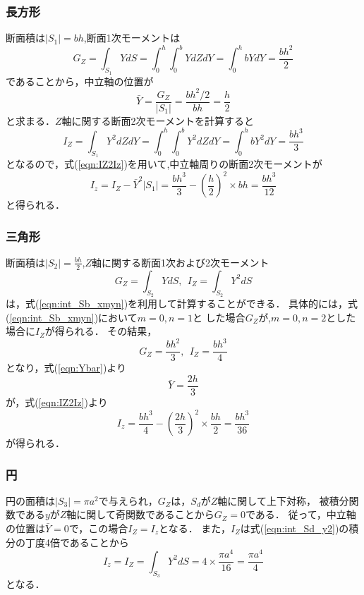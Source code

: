 \documentclass[10pt,a4j]{jbook}
\begin{document}
\subsubsection{長方形}
断面積は$\left|S_1\right|=bh$,断面1次モーメントは
\begin{equation}
	G_Z=\int_{S_1} Y dS=\int_0^h\int_0^b Y dZdY=\int_0^h bYdY=\frac{bh^2}{2}
	\label{eqn:GZ_S1}
\end{equation}
であることから，中立軸の位置が
\begin{equation}
	\bar Y= \frac{G_Z}{\left| S_1 \right|}=\frac{bh^2/2}{bh}=\frac{h}{2}
\end{equation}
と求まる．$Z$軸に関する断面2次モーメントを計算すると
\begin{equation}
	I_Z=\int_{S_1} Y^2dZdY
	=\int_0^h \int_0^b Y^2dZdY 
	=\int_0^h bY^2dY 
	=\frac{bh^3}{3}
	\label{eqn:IZ_S1}
\end{equation}
となるので，式(\ref{eqn:IZ2Iz})を用いて,中立軸周りの断面2次モーメントが
\begin{equation}
	I_z= I_Z-\bar Y^2 \left| S_1 \right| = \frac{bh^3}{3}-\left(\frac{h}{2}\right)^2\times bh=\frac{bh^3}{12}
	\label{eqn:Iz_S1}
\end{equation}
と得られる．
\subsubsection{三角形}
断面積は$\left|S_2\right|=\frac{bh}{2}$,$Z$軸に関する断面1次および2次モーメント
\begin{equation}
	G_Z=\int_{S_2} Y dS, \ \ I_Z=\int_{S_2}Y^2 dS
\end{equation}
は，式(\ref{eqn:int_Sb_xmyn})を利用して計算することができる．
具体的には，式(\ref{eqn:int_Sb_xmyn})において$m=0, n=1$と
した場合$G_Z$が,$m=0, n=2$とした場合に$I_Z$が得られる．
その結果，
\begin{equation}
	G_Z=\frac{bh^2}{3}, \ \ 
	I_Z=\frac{bh^3}{4}
	\label{eqn:GI_S2}
\end{equation}
となり，式(\ref{eqn:Ybar})より
\begin{equation}
	\bar{Y}=\frac{2h}{3}
\end{equation}
が，式(\ref{eqn:IZ2Iz})より
\begin{equation}
	I_z=\frac{bh^3}{4}-\left(\frac{2h}{3}\right)^2\times \frac{bh}{2}=\frac{bh^3}{36}
	\label{eqn:Iz_S2}
\end{equation}
が得られる．
\subsubsection{円}
円の面積は$\left|S_3\right|=\pi a^2$で与えられ，$G_Z$は，$S_d$が$Z$軸に関して上下対称，
被積分関数である$y$が$Z$軸に関して奇関数であることから$G_Z=0$である．
従って，中立軸の位置は$\bar Y=0$で，この場合$I_Z=I_z$となる．
また，$I_Z$は式(\ref{eqn:int_Sd_y2})の積分の丁度4倍であることから
\begin{equation}
	I_z=I_Z=\int_{S_3}Y^2dS=4\times \frac{\pi a^4}{16}=\frac{\pi a^4}{4}
	\label{eqn:Iz_S3}
\end{equation}
となる．
\end{document}
